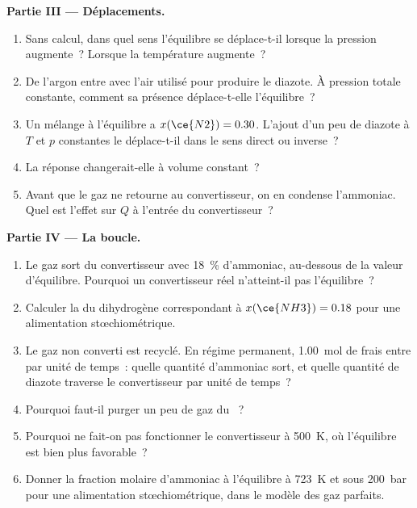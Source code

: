 \begin{problem}
\medskip
\noindent\textbf{Partie III --- Déplacements.}
\begin{enumerate}[resume]
  \item Sans calcul, dans quel sens l'équilibre se déplace-t-il lorsque
        la pression augmente~? Lorsque la température augmente~?
  \item De l'argon entre avec l'air utilisé pour produire le diazote. À pression totale
        constante, comment sa présence déplace-t-elle l'équilibre~?
  \item Un mélange à l'équilibre a $x(\ce{N2}) = 0.30$. L'ajout d'un peu de
        diazote à $T$ et $p$ constantes le déplace-t-il dans le sens direct ou inverse~?
  \item La réponse changerait-elle à volume constant~?
  \item Avant que le gaz ne retourne au convertisseur, on en condense
        l'ammoniac. Quel est l'effet sur $Q$ à l'entrée du convertisseur~?
\end{enumerate}

\medskip
\noindent\textbf{Partie IV --- La boucle.}
\begin{enumerate}[resume]
  \item Le gaz sort du convertisseur avec \qty{18}{\percent} d'ammoniac, au-dessous de
        la valeur d'équilibre. Pourquoi un convertisseur réel n'atteint-il pas
        l'équilibre~?
  \item Calculer la  du dihydrogène correspondant à
        $x(\ce{NH3}) = 0.18$ pour une alimentation stœchiométrique.
  \item Le gaz non converti est recyclé. En régime permanent, \qty{1.00}{mol}
        de  frais entre par unité de temps~: quelle quantité d'ammoniac sort, et quelle
        quantité de diazote traverse le convertisseur par unité de temps~?
  \item Pourquoi faut-il purger un peu de gaz du ~?
  \item Pourquoi ne fait-on pas fonctionner le convertisseur à \qty{500}{K}, où l'équilibre est
        bien plus favorable~?
  \item Donner la fraction molaire d'ammoniac à l'équilibre à \qty{723}{K} et sous
        \qty{200}{bar} pour une alimentation stœchiométrique, dans le modèle des gaz parfaits.
\end{enumerate}
\end{problem}
